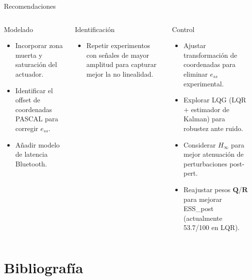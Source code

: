 \documentclass[mathserif,spanish,10pt]{beamer}
\begin{document}
\begin{frame}{Recomendaciones}
\begin{columns}[T]
  \begin{block}{Modelado}
    \begin{itemize}
      \item Incorporar zona muerta y saturación del actuador.
      \item Identificar el offset de coordenadas PASCAL para corregir $e_{ss}$.
      \item Añadir modelo de latencia Bluetooth.
    \end{itemize}
  \end{block}
  \begin{block}{Identificación}
    \begin{itemize}
      \item Repetir experimentos con señales de mayor amplitud para capturar mejor la no linealidad.
    \end{itemize}
  \end{block}

  \begin{block}{Control}
    \begin{itemize}
      \item Ajustar transformación de coordenadas para eliminar $e_{ss}$ experimental.
      \item Explorar LQG (LQR + estimador de Kalman) para robustez ante ruido.
      \item Considerar $H_\infty$ para mejor atenuación de perturbaciones post-pert.
      \item Reajustar pesos $\mathbf{Q}$/$\mathbf{R}$ para mejorar ESS\_post (actualmente 53.7/100 en LQR).
    \end{itemize}
  \end{block}
\end{columns}
\end{frame}

\section{Bibliografía}
\end{document}
